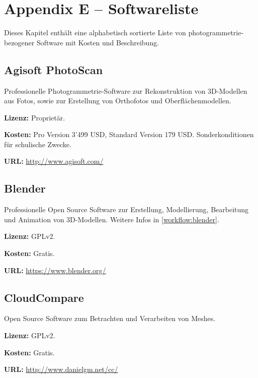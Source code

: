 \chapter{Appendix E -- Softwareliste}

\label{ch:software}

{

\setlength{\parindent}{0em}
\setlength{\parskip}{0.8em}

Dieses Kapitel enthält eine alphabetisch sortierte Liste von
photogrammetrie-bezogener Software mit Kosten und Beschreibung.


\section{Agisoft PhotoScan}

Professionelle Photogrammetrie-Software zur Rekonstruktion von 3D-Modellen aus
Fotos, sowie zur Erstellung von Orthofotos und Oberflächenmodellen.

\textbf{Lizenz:} Proprietär.

\textbf{Kosten:} Pro Version 3'499 USD, Standard Version 179 USD.
Sonderkonditionen für schulische Zwecke.

\textbf{URL:} \url{http://www.agisoft.com/}


\section{Blender}

Professionelle Open Source Software zur Erstellung, Modellierung, Bearbeitung
und Animation von 3D-Modellen. Weitere Infos in \autoref{workflow:blender}.

\textbf{Lizenz:} GPLv2.

\textbf{Kosten:} Gratis.

\textbf{URL:} \url{https://www.blender.org/}


\section{CloudCompare}

Open Source Software zum Betrachten und Verarbeiten von Meshes.

\textbf{Lizenz:} GPLv2.

\textbf{Kosten:} Gratis.

\textbf{URL:} \url{http://www.danielgm.net/cc/}

}
